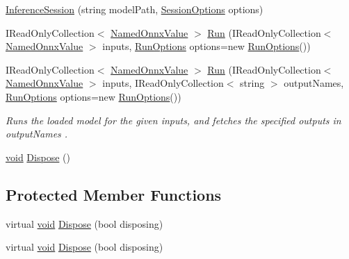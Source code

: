 \begin{DoxyCompactItemize}
\item 
\mbox{\hyperlink{classMicrosoft_1_1ML_1_1OnnxRuntime_1_1InferenceSession_a83d9c88f3b76f5b5011b830faab20c83}{Inference\+Session}} (string model\+Path, \mbox{\hyperlink{classMicrosoft_1_1ML_1_1OnnxRuntime_1_1SessionOptions}{Session\+Options}} options)
\item 
I\+Read\+Only\+Collection$<$ \mbox{\hyperlink{classMicrosoft_1_1ML_1_1OnnxRuntime_1_1NamedOnnxValue}{Named\+Onnx\+Value}} $>$ \mbox{\hyperlink{classMicrosoft_1_1ML_1_1OnnxRuntime_1_1InferenceSession_a821eafb18fe5c2b806d9a555c84dd0fc}{Run}} (I\+Read\+Only\+Collection$<$ \mbox{\hyperlink{classMicrosoft_1_1ML_1_1OnnxRuntime_1_1NamedOnnxValue}{Named\+Onnx\+Value}} $>$ inputs, \mbox{\hyperlink{structMicrosoft_1_1ML_1_1OnnxRuntime_1_1RunOptions}{Run\+Options}} options=new \mbox{\hyperlink{structMicrosoft_1_1ML_1_1OnnxRuntime_1_1RunOptions}{Run\+Options}}())
\item 
I\+Read\+Only\+Collection$<$ \mbox{\hyperlink{classMicrosoft_1_1ML_1_1OnnxRuntime_1_1NamedOnnxValue}{Named\+Onnx\+Value}} $>$ \mbox{\hyperlink{classMicrosoft_1_1ML_1_1OnnxRuntime_1_1InferenceSession_a4dcbba273774414cd195c7f6777f918e}{Run}} (I\+Read\+Only\+Collection$<$ \mbox{\hyperlink{classMicrosoft_1_1ML_1_1OnnxRuntime_1_1NamedOnnxValue}{Named\+Onnx\+Value}} $>$ inputs, I\+Read\+Only\+Collection$<$ string $>$ output\+Names, \mbox{\hyperlink{structMicrosoft_1_1ML_1_1OnnxRuntime_1_1RunOptions}{Run\+Options}} options=new \mbox{\hyperlink{structMicrosoft_1_1ML_1_1OnnxRuntime_1_1RunOptions}{Run\+Options}}())
\begin{DoxyCompactList}\small\item\em Runs the loaded model for the given inputs, and fetches the specified outputs in {\itshape output\+Names} . \end{DoxyCompactList}\item 
\mbox{\hyperlink{mlasi_8h_a88f941d423cb2a819b70a1358982b1a6}{void}} \mbox{\hyperlink{classMicrosoft_1_1ML_1_1OnnxRuntime_1_1InferenceSession_a2eb590b9d54dea1e8976e19bb844a7fe}{Dispose}} ()
\end{DoxyCompactItemize}
\subsection*{Protected Member Functions}
\begin{DoxyCompactItemize}
\item 
virtual \mbox{\hyperlink{mlasi_8h_a88f941d423cb2a819b70a1358982b1a6}{void}} \mbox{\hyperlink{classMicrosoft_1_1ML_1_1OnnxRuntime_1_1InferenceSession_a4533e6bf48e8f4e3e219521d5bf7ed2f}{Dispose}} (bool disposing)
\item 
virtual \mbox{\hyperlink{mlasi_8h_a88f941d423cb2a819b70a1358982b1a6}{void}} \mbox{\hyperlink{classMicrosoft_1_1ML_1_1OnnxRuntime_1_1InferenceSession_a4533e6bf48e8f4e3e219521d5bf7ed2f}{Dispose}} (bool disposing)
\end{DoxyCompactItemize}
